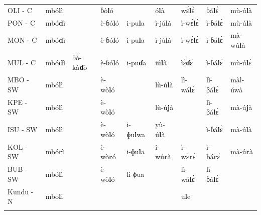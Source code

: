 \documentclass[output=paper,colorlinks,citecolor=brown
]{langscibook}
\begin{document}
\begin{table}[b]
{\begin{tabular}{lllllllll}
OLI - C                   & mbó\textbf{l}ì                &                          & ɓò\textbf{l}ó                 &                       & ó\textbf{l}à                     & wɛ́\textbf{l}ɛ̀                   & ɓá\textbf{l}ɛ̀                 & mù-ú\textbf{l}à             \\
PON - C                   & mbó\textbf{d}ì                &                          & è-ɓó\textbf{l}ó              & i-pu\textbf{l}a                & ì-jú\textbf{l}à                 & ì-wɛ́\textbf{l}ɛ̀                & ì-ɓá\textbf{l}ɛ̀              & mù-ú\textbf{l}à             \\
MON - C                   & mbó\textbf{d}ì                &                          & è-ɓó\textbf{l}ó              & i-pu\textbf{l}a                & ì-jú\textbf{l}à                 & ì-wɛ́\textbf{l}ɛ̀                & ì-ɓá\textbf{l}ɛ̀              & mà-wú\textbf{l}à            \\
MUL - C                   & mbó\textbf{d}ì                & ɓò-kà\textbf{ɗ}ò               & è-ɓó\textbf{l}ó              & i-pu\textbf{ɗ}a                & iú\textbf{l}à                    & ìɛ́\textbf{ɗ}ɛ̀                  & ì-ɓá\textbf{l}ɛ̀              & mù-ú\textbf{l}ɛ̀             \\
MBO - SW                  & mbó\textbf{l}ì                &                          & è-wò\textbf{l}ó              &                       & lù-ú\textbf{l}à                 & lì-wá\textbf{l}ɛ̀               & lì-βá\textbf{l}ɛ̀             & màl-úwà            \\
KPE - SW                  & mbó\textbf{l}ì                &                          & è-wò\textbf{l}ó              &                       & lù-ú\textbf{j}à                 &                          & lì-βá\textbf{l}ɛ̀             & mà-ú\textbf{j}à             \\
ISU - SW                  & mbó\textbf{l}ì                &                          & è-wò\textbf{l}ó              & i-ɸu\textbf{l}wa               & yù-ú\textbf{l}à                 &                          & ì-ɓá\textbf{l}ɛ̀              & mà-ú\textbf{l}à             \\
KOL - SW                  & mbó\textbf{r}ì                &                          & è-wò\textbf{r}ó              & i-ɸu\textbf{l}a                & i-wú\textbf{r}à                  & ì-wɛ́\textbf{r}ɛ̀                & ì-bá\textbf{r}ɛ̀              & mà-ú\textbf{r}à             \\
BUB - SW                  & mbó\textbf{l}ì                &                          & è-wò\textbf{l}ó              & li-ɸua                &                           & lì-wá\textbf{l}ɛ̀               & lì-ɓá\textbf{l}ɛ̀             &                       \\
Kundu - N                 & mbo\textbf{l}i                  &                          &                        &                       &                           & u\textbf{l}e                      &                        &                     \\ 
   \lspbottomrule
 \end{tabular}
 }
\end{table}
\end{document}
